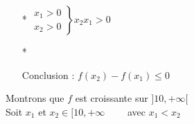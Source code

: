 \begin{itemize}
\item[*] $\left. \begin{array}{c}
                     x_1 > 0\\
                     x_2 > 0 
                 \end{array} \right\rbrace x_2 x_1 > 0 $ \\
                 
\item[*]  \\

\bigskip 
                 
  Conclusion : $f(x_2) - f(x_1) \leqslant 0 $

\end{itemize}

\bigskip    

\newpage
  
Montrons que $f$ est croissante sur $]10, +\infty[$ \\
                              
Soit $x_1$ et $x_2 \in [10,+\infty \qquad $ avec $\boxed {x_1 < x_2} $ \\

